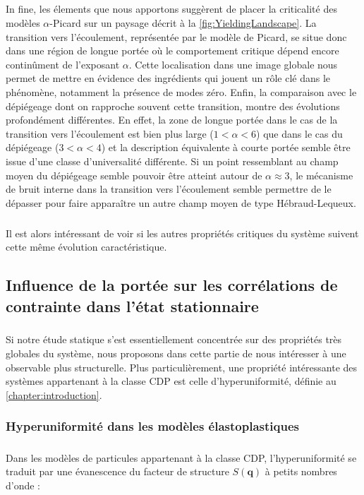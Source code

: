 \subparagraph{}In fine, les élements que nous apportons suggèrent de placer la criticalité des modèles $\alpha$-Picard sur un paysage décrit à la \autoref{fig:YieldingLandscape}. La transition vers l'écoulement, représentée par le modèle de Picard, se situe donc dans une région de longue portée où le comportement critique dépend encore continûment de l'exposant $\alpha$. Cette localisation dans une image globale nous permet de mettre en évidence des ingrédients qui jouent un rôle clé dans le phénomène, notamment la présence de modes zéro. Enfin, la comparaison avec le dépiégeage dont on rapproche souvent cette transition, montre des évolutions profondément différentes. En effet, la zone de longue portée dans le cas de la transition vers l'écoulement est bien plus large ($1<\alpha<6$) que dans le cas du dépiégeage ($3<\alpha<4$) et la description équivalente à courte portée semble être issue d'une classe d'universalité différente. Si un point ressemblant au champ moyen du dépiégeage semble pouvoir être atteint autour de $\alpha\approx 3$, le mécanisme de bruit interne dans la transition vers l'écoulement semble permettre de le dépasser pour faire apparaître un autre champ moyen de type Hébraud-Lequeux.

\subparagraph{}Il est alors intéressant de voir si les autres propriétés critiques du système suivent cette même évolution caractéristique.

\subsection{Influence de la portée sur les corrélations de contrainte dans l'état stationnaire}

\subparagraph{}Si notre étude statique s'est essentiellement concentrée sur des propriétés très globales du système, nous proposons dans cette partie de nous intéresser à une observable plus structurelle. Plus particulièrement, une propriété intéressante des systèmes appartenant à la classe CDP est celle d'hyperuniformité, définie au \autoref{chapter:introduction}.

\subsubsection{Hyperuniformité dans les modèles élastoplastiques}

\subparagraph{}Dans les modèles de particules appartenant à la classe CDP, l'hyperuniformité se traduit par une évanescence du facteur de structure $S(\mathbf{q})$ à petits nombres d'onde :

